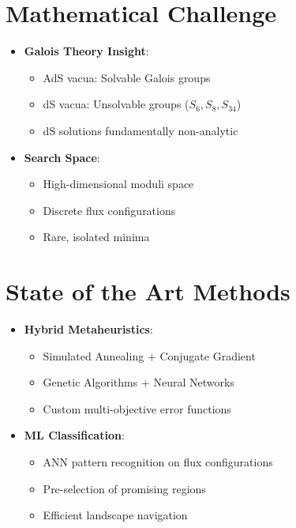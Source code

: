 \documentclass[12pt]{article}
\begin{document}
\section*{Mathematical Challenge}
\begin{itemize}
\item \textbf{Galois Theory Insight}:
  \begin{itemize}
  \item AdS vacua: Solvable Galois groups
  \item dS vacua: Unsolvable groups ($S_6, S_8, S_{34}$)
  \item dS solutions fundamentally non-analytic
  \end{itemize}
\item \textbf{Search Space}: 
  \begin{itemize}
  \item High-dimensional moduli space
  \item Discrete flux configurations
  \item Rare, isolated minima
  \end{itemize}
\end{itemize}

\section*{State of the Art Methods}
\begin{itemize}
\item \textbf{Hybrid Metaheuristics}:
  \begin{itemize}
  \item Simulated Annealing + Conjugate Gradient
  \item Genetic Algorithms + Neural Networks
  \item Custom multi-objective error functions
  \end{itemize}
\item \textbf{ML Classification}:
  \begin{itemize}
  \item ANN pattern recognition on flux configurations
  \item Pre-selection of promising regions
  \item Efficient landscape navigation
  \end{itemize}
\end{itemize}
\end{document}

